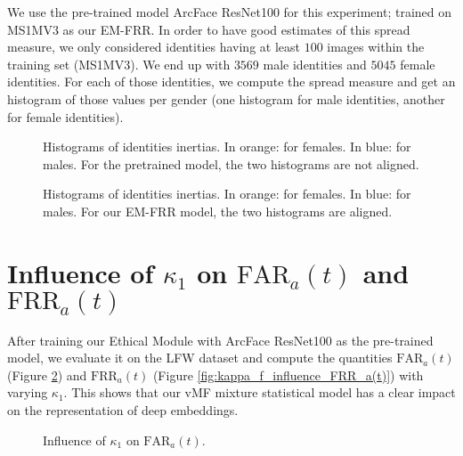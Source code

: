 \documentclass[nohyperref]{article}
\theoremstyle{plain}
\theoremstyle{definition}
\theoremstyle{remark}
\begin{document}
We use the pre-trained model ArcFace ResNet100 for this experiment; trained on MS1MV3 as our EM-FRR. In order to have good estimates of this spread measure, we only considered identities having at least $100$ images within the training set (MS1MV3). We end up with $3569$ male identities and $5045$ female identities. For each of those identities, we compute the spread measure and get an histogram of those values per gender (one histogram for male identities, another for female identities).

\begin{figure}[h]
    \centering
    
    \caption{Histograms of identities inertias. In orange: for females. In blue: for males. For the pretrained model, the two histograms are not aligned.}
    \hspace{0.2cm}

    \caption{Histograms of identities inertias. In orange: for females. In blue: for males. For our EM-FRR model, the two histograms are aligned.}    \label{}
\end{figure}






\section{Influence of $\kappa_1$ on $\mathrm{FAR}_a(t)$ and $\mathrm{FRR}_a(t)$}

After training our Ethical Module with ArcFace ResNet100 as the pre-trained model, we evaluate it on the LFW dataset and compute the quantities $\mathrm{FAR}_a(t)$ (Figure \ref{fig:kappa_f_influence_FAR_a(t)}) and $\mathrm{FRR}_a(t)$ (Figure \ref{fig:kappa_f_influence_FRR_a(t)}) with varying $\kappa_1$. This shows that our vMF mixture statistical model has a clear impact on the representation of deep embeddings.



\begin{figure}[h]
    \centering
     \hspace{2cm}
   \caption{Influence of $\kappa_1$ on $\mathrm{FAR}_a(t)$.}    \label{fig:kappa_f_influence_FAR_a(t)}
\end{figure}
\end{document}

